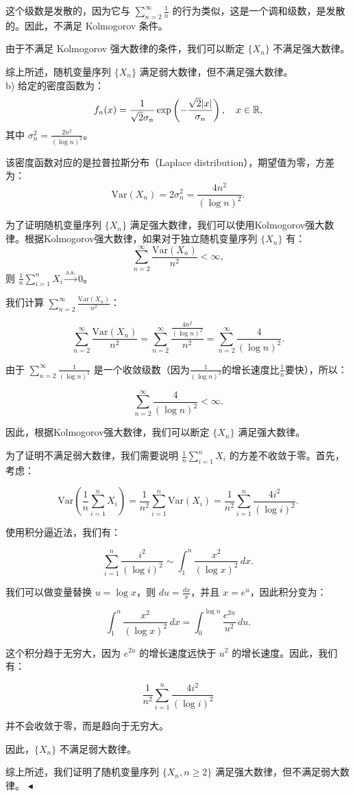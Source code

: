 \documentclass[11pt]{article}
\newenvironment{question}[2][Question]{\begin{trivlist}
\item[\hskip \labelsep {\bfseries #1}\hskip \labelsep {\bfseries #2.}]}{\hfill$\blacktriangleleft$\end{trivlist}}
\begin{document}
\begin{question}{3 (10') (大数定律)}
这个级数是发散的，因为它与 \(\sum_{n=2}^{\infty} \frac{1}{n}\) 的行为类似，这是一个调和级数，是发散的。因此，不满足 Kolmogorov 条件。

由于不满足 Kolmogorov 强大数律的条件，我们可以断定 \(\{X_n\}\) 不满足强大数律。

综上所述，随机变量序列 \(\{X_n\}\) 满足弱大数律，但不满足强大数律。\\


b) 给定的密度函数为：
\[ f_n(x) = \frac{1}{\sqrt{2} \sigma_n} \exp\left(-\frac{\sqrt{2}\abs{x}}{\sigma_n}\right), \quad x \in \mathbb{R}, \]
其中 \(\sigma_n^2 = \frac{2n^2}{(\log n)^2}\)。

该密度函数对应的是拉普拉斯分布（Laplace distribution），期望值为零，方差为：
\[ \mathrm{Var}(X_n) = 2 \sigma_n^2 = \frac{4n^2}{(\log n)^2}. \]

为了证明随机变量序列 \(\{X_n\}\) 满足强大数律，我们可以使用Kolmogorov强大数律。根据Kolmogorov强大数律，如果对于独立随机变量序列 \(\{X_n\}\) 有：
\[ \sum_{n=2}^{\infty} \frac{\mathrm{Var}(X_n)}{n^2} < \infty, \]
则 \(\frac{1}{n} \sum_{i=1}^{n} X_i \xrightarrow{\text{a.s.}} 0\)。

我们计算 \(\sum_{n=2}^{\infty} \frac{\mathrm{Var}(X_n)}{n^2}\)：

\[ \sum_{n=2}^{\infty} \frac{\mathrm{Var}(X_n)}{n^2} = \sum_{n=2}^{\infty} \frac{\frac{4n^2}{(\log n)^2}}{n^2} = \sum_{n=2}^{\infty} \frac{4}{(\log n)^2}. \]

由于 \(\sum_{n=2}^{\infty} \frac{1}{(\log n)^2}\) 是一个收敛级数（因为\(\frac{1}{(\log n)^2}\)的增长速度比\(\frac{1}{n}\)要快），所以：

\[ \sum_{n=2}^{\infty} \frac{4}{(\log n)^2} < \infty. \]

因此，根据Kolmogorov强大数律，我们可以断定 \(\{X_n\}\) 满足强大数律。


为了证明不满足弱大数律，我们需要说明 \(\frac{1}{n} \sum_{i=1}^{n} X_i\) 的方差不收敛于零。首先，考虑：

\[ \mathrm{Var}\left( \frac{1}{n} \sum_{i=1}^{n} X_i \right) = \frac{1}{n^2} \sum_{i=1}^{n} \mathrm{Var}(X_i) = \frac{1}{n^2} \sum_{i=1}^{n} \frac{4i^2}{(\log i)^2}. \]

使用积分逼近法，我们有：

\[ \sum_{i=1}^{n} \frac{i^2}{(\log i)^2} \sim \int_{1}^{n} \frac{x^2}{(\log x)^2} \, dx. \]

我们可以做变量替换 \( u = \log x \)，则 \( du = \frac{dx}{x} \)，并且 \( x = e^u \)，因此积分变为：

\[ \int_{1}^{n} \frac{x^2}{(\log x)^2} \, dx = \int_{0}^{\log n} \frac{e^{2u}}{u^2} \, du. \]

这个积分趋于无穷大，因为 \( e^{2u} \) 的增长速度远快于 \( u^2 \) 的增长速度。因此，我们有：

\[ \frac{1}{n^2} \sum_{i=1}^{n} \frac{4i^2}{(\log i)^2} \]

并不会收敛于零，而是趋向于无穷大。

因此，\(\{X_n\}\) 不满足弱大数律。

综上所述，我们证明了随机变量序列 \(\{X_n, n \geq 2\}\) 满足强大数律，但不满足弱大数律。
    \end{question}
\end{document}
